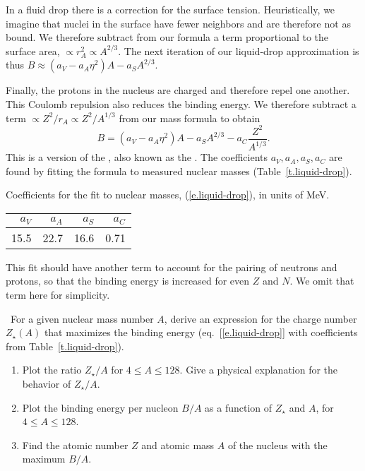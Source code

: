 In a fluid drop there is a correction for the surface tension. Heuristically, we imagine that nuclei in the surface have fewer neighbors and are therefore not as bound. We therefore subtract from our formula a term proportional to the surface area, $\propto r_{A}^{2} \propto A^{2/3}$. The next iteration of our liquid-drop approximation is thus $B \approx (a_{V}- a_{A}\eta^{2})A - a_{S}A^{2/3} $.

Finally, the protons in the nucleus are charged and therefore repel one another. This Coulomb repulsion also reduces the binding energy. We therefore subtract a term $\propto Z^{2}/r_{A}\propto Z^{2}/A^{1/3}$ from our mass formula to obtain
\begin{equation}\label{e.liquid-drop}
B = \left(a_{V} -a_{A}\eta^{2}\right) A -  a_{S}A^{2/3} - a_{C} \frac{Z^{2}}{A^{1/3}}. 
\end{equation}
This is a version of the , also known as the .
The coefficients $a_{V},a_{A},a_{S},a_{C}$ are found by fitting the formula to measured nuclear masses (Table~\ref{t.liquid-drop}).
\begin{margintable}
\caption[Liquid-drop coefficients]{\label{t.liquid-drop} Coefficients for the fit to nuclear masses, (\protect\ref{e.liquid-drop}), in units of MeV.}
\begin{tabular}{rrrr}
$a_V$ & $a_A$ & $a_S$ & $a_C$ \\
\hline
15.5 & 22.7 & 16.6 & 0.71\\
\end{tabular}
\end{margintable}
\noindent This fit should have another term to account for the pairing of neutrons and protons, so that the binding energy is increased for even $Z$ and $N$. We omit that term here for simplicity.

\begin{exercisebox}
\label{ex.nuclear-landscape}
\notebook~For a given nuclear mass number $A$, derive an expression for the charge number $Z_{\star}(A)$ that maximizes the binding energy (eq.~[\ref{e.liquid-drop}] with coefficients from Table~\ref{t.liquid-drop}).
\begin{enumerate}
\item Plot the ratio $Z_{\star}/A$ for $4\le A\le 128$. Give a physical explanation for the behavior of $Z_{\star}/A$.
\item Plot the binding energy per nucleon $B/A$ as a function of $Z_{\star}$ and $A$, for $4\le A\le 128$.
\item Find the atomic number $Z$ and atomic mass $A$ of the nucleus with the maximum $B/A$.
\end{enumerate}
\end{exercisebox}

